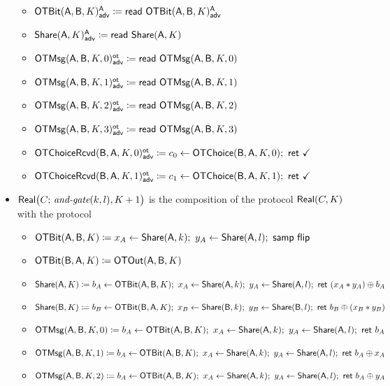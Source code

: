 \begin{itemize}
\begin{itemize}
\item {\color{blue} $\mathsf{OTBit}(\mathsf{A},\mathsf{B},K)^{\mathsf{A}}_{\mathsf{adv}} \coloneqq \mathsf{read} \ \mathsf{OTBit}(\mathsf{A},\mathsf{B},K)^{\mathsf{A}}_{\mathsf{adv}}$}
\item {\color{blue} $\mathsf{Share}(\mathsf{A},K)^{\mathsf{A}}_{\mathsf{adv}} \coloneqq \mathsf{read} \ \mathsf{Share}(\mathsf{A},K)$}\medskip
\item {\color{blue} $\mathsf{OTMsg}(\mathsf{A},\mathsf{B},K,0)^{\mathsf{ot}}_{\mathsf{adv}} \coloneqq \mathsf{read} \ \mathsf{OTMsg}(\mathsf{A},\mathsf{B},K,0)$}
\item {\color{blue} $\mathsf{OTMsg}(\mathsf{A},\mathsf{B},K,1)^{\mathsf{ot}}_{\mathsf{adv}} \coloneqq \mathsf{read} \ \mathsf{OTMsg}(\mathsf{A},\mathsf{B},K,1)$}
\item {\color{blue} $\mathsf{OTMsg}(\mathsf{A},\mathsf{B},K,2)^{\mathsf{ot}}_{\mathsf{adv}} \coloneqq \mathsf{read} \ \mathsf{OTMsg}(\mathsf{A},\mathsf{B},K,2)$}
\item {\color{blue} $\mathsf{OTMsg}(\mathsf{A},\mathsf{B},K,3)^{\mathsf{ot}}_{\mathsf{adv}} \coloneqq \mathsf{read} \ \mathsf{OTMsg}(\mathsf{A},\mathsf{B},K,3)$}\medskip
\item {\color{blue} $\LeakOTChoiceRcvd(\B,\A,K,0)^\ot_\adv \coloneqq c_0 \leftarrow \OTChoice(\B,\A,K,0); \ \ret{\checkmark}$}
\item {\color{blue} $\LeakOTChoiceRcvd(\B,\A,K,1)^\ot_\adv \coloneqq c_1 \leftarrow \OTChoice(\B,\A,K,1); \ \ret{\checkmark}$}
\end{itemize}
\item $\mathsf{Real}\big(C; \, \textit{and-gate}(k,l),K+1\big)$ is the composition of the protocol $\mathsf{Real}(C,K)$ with the protocol
\begin{itemize}
\item $\OTBit(\A,\B,K) \coloneqq x_A \leftarrow \Share(\A,k); \ y_A \leftarrow \Share(\A,l); \ \samp{\flip}$
\item $\mathsf{OTBit}(\mathsf{B},\mathsf{A},K) \coloneqq \mathsf{OTOut}(\mathsf{A},\mathsf{B},K)$\smallskip
\item $\mathsf{Share}(\mathsf{A},K) \coloneqq b_A \leftarrow \mathsf{OTBit}(\mathsf{A},\mathsf{B},K); \ x_A \leftarrow \mathsf{Share}(\mathsf{A},k); \ y_A \leftarrow \mathsf{Share}(\mathsf{A},l); \ \mathsf{ret} \ (x_A * y_A) \oplus b_A$
\item $\mathsf{Share}(\mathsf{B},K) \coloneqq b_B \leftarrow \mathsf{OTBit}(\mathsf{B},\mathsf{A},K); \ x_B \leftarrow \mathsf{Share}(\mathsf{B},k); \ y_B \leftarrow \mathsf{Share}(\mathsf{B},l); \ \mathsf{ret} \ b_B \oplus (x_B * y_B)$\smallskip
\item $\mathsf{OTMsg}(\mathsf{A},\mathsf{B},K,0) \coloneqq b_A \leftarrow \mathsf{OTBit}(\mathsf{A},\mathsf{B},K); \ x_A \leftarrow \mathsf{Share}(\mathsf{A},k); \ y_A \leftarrow \mathsf{Share}(\mathsf{A},l); \ \mathsf{ret} \ b_A$
\item $\mathsf{OTMsg}(\mathsf{A},\mathsf{B},K,1) \coloneqq b_A \leftarrow \mathsf{OTBit}(\mathsf{A},\mathsf{B},K); \ x_A \leftarrow \mathsf{Share}(\mathsf{A},k); \ y_A \leftarrow \mathsf{Share}(\mathsf{A},l); \ \mathsf{ret} \ b_A \oplus x_A$
\item $\mathsf{OTMsg}(\mathsf{A},\mathsf{B},K,2) \coloneqq b_A \leftarrow \mathsf{OTBit}(\mathsf{A},\mathsf{B},K); \ x_A \leftarrow \mathsf{Share}(\mathsf{A},k); \ y_A \leftarrow \mathsf{Share}(\mathsf{A},l); \ \mathsf{ret} \ b_A \oplus y_A$

\end{itemize}
\end{itemize}
